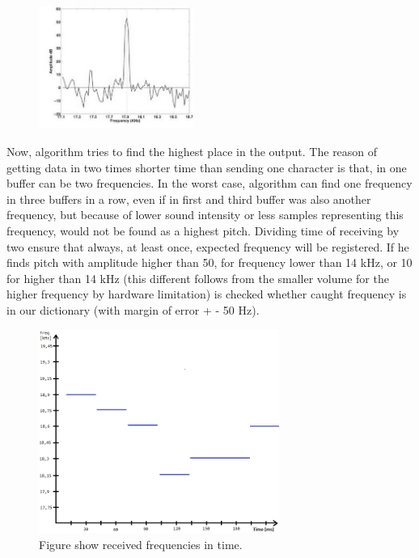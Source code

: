\documentclass[11pt,titlepage]{article}
\theoremstyle{plain}
\begin{document}
\begin{figure}[H]
	\centering
	\includegraphics[width=0.45\textwidth]{img/peaks_1}
	\label{fig:F2}
\end{figure}



Now, algorithm tries to find the highest place in the output. The reason of getting data in two times shorter time than sending one character is that, in one buffer can be two frequencies. In the worst case, algorithm can find one frequency in three buffers in a row, even if in first and third buffer was also another frequency, but because of lower sound intensity or less samples representing this frequency, would not be found as a highest pitch. Dividing time of receiving by two ensure that always, at least once, expected frequency will be registered. If he finds pitch with amplitude higher than 50, for frequency lower than 14 kHz, or 10 for higher than 14 kHz (this different follows from the smaller volume for the higher frequency by hardware limitation) is checked whether caught frequency is in our dictionary (with margin of error + - 50 Hz). 


\begin{figure}[H]
	\centering
	\includegraphics[width=0.70\textwidth]{img/receiving}
	\caption{Figure show received frequencies in time.}
\end{figure}
\end{document}
